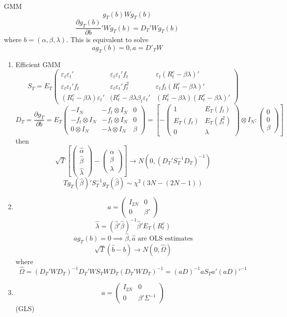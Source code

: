 \documentclass[11pt, a4paper, oneside]{article}
\theoremstyle{definition}
\theoremstyle{proposition}
\theoremstyle{corollary}
\theoremstyle{lemma}
\theoremstyle{theorem}
\begin{document}
GMM $$g_T(b) Wg_T(b)$$
$$\frac{\partial g_T(b)}{\partial b}' W g_T(b) = D_T'Wg_T(b)$$
where $b = (\alpha, \beta, \lambda)$. 
This is equivalent to solve
$$a g_T(b) = 0, a= D'_T W$$
\begin{enumerate}[(1)]
\item Efficient GMM
$$S_T = E_T\begin{pmatrix} \varepsilon_t\varepsilon_t' & \varepsilon_t\varepsilon_t'f_t & \varepsilon_t(R_t^e - \beta\lambda)' \\
\varepsilon_t\varepsilon_t'f_t & \varepsilon_t\varepsilon_t'f_t^2 & \varepsilon_tf_t(R_t^e - \beta \lambda)' \\ 
(R_t^e - \beta\lambda)\varepsilon_t' & (R_t^e - \beta\lambda \beta_t\varepsilon_t' & (R_t^e -\beta \lambda)(R_t^e - \beta\lambda)' \end{pmatrix}$$
$$
D_T = \frac{\partial g_T}{\partial b} = E_T \begin{pmatrix}-I_N & -f_t \otimes I_N & 0 \\
-f_t\otimes I_N & -f_t\otimes I_N & 0 \\
0\otimes I_N & -\lambda \otimes I_N & \beta \end{pmatrix} = \left[- \begin{pmatrix}
1 & E_T(f_t) \\
E_T(f_t) & E_T(f_t^2) \\
0 & \lambda \end{pmatrix}\otimes  I_N : \begin{pmatrix}0\\ 0 \\ \beta\end{pmatrix}\right]
$$
then $$\sqrt{T}\left[\begin{pmatrix}\hat{\alpha} \\ \hat{\beta} \\ \hat{\lambda}\end{pmatrix} -\begin{pmatrix}\alpha \\ \beta \\ \lambda\end{pmatrix}\right] \to N(0, (D_T'S_T^{-1}D_T)^{-1})$$
$$T g_T(\hat{\beta})'S_T^{-1}g_T(\hat{\beta}) \sim \chi^2(3N - (2N -1))$$
\item $$a = \begin{pmatrix} I_{2N} & 0 \\ 0 & \beta'\end{pmatrix}$$
$$\hat{\lambda} = (\hat{\beta}'\hat{\beta})^{-1}\hat{\beta}'E_T(R_t^e)$$
$$ag_T(b) = 0\implies \hat{\beta}, \hat{a} \text{ are OLS estimates}$$
$$\sqrt{T}(\hat{b} - b) \to N(0, \hat{\Omega})$$
where 
$$\hat{\Omega} = (D_T'WD_T)^{-1}D_T'WS_TWD_T(D_T'WD_T)^{-1} = (aD)^{-1}aS_Ta'(aD)'^{-1}$$
\item $$a = \begin{pmatrix} I_{2N} & 0 \\ 0 & \beta'\Sigma^{-1}\end{pmatrix}$$ (GLS)


\end{enumerate}
\end{document}
